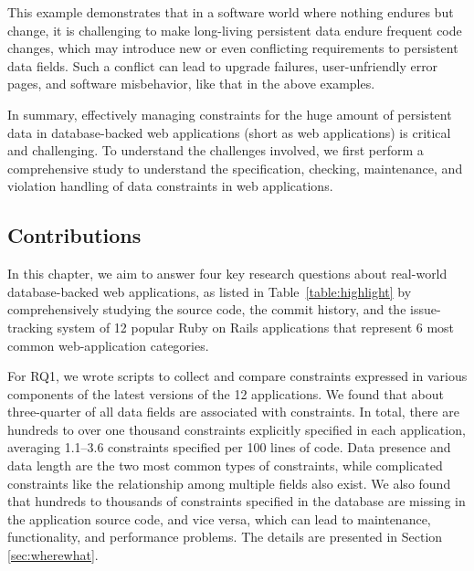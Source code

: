 This example demonstrates that in a software world where nothing endures but
change, it is challenging to make long-living persistent data endure
frequent code changes, which may introduce new or even conflicting  
requirements to persistent data fields. Such a conflict can lead to 
 upgrade failures, user-unfriendly error pages, and software misbehavior, like
 that in the above examples.


 
In summary, effectively managing constraints for the huge amount of persistent data in 
database-backed
web applications (short as web applications) is critical and challenging. 
To understand the challenges involved, we first perform a comprehensive study to understand the specification, checking, maintenance, and
violation handling of data constraints in web applications.




 





 

\subsection{Contributions}
In this chapter, we aim to answer four key research questions about real-world database-backed
web applications, as listed in Table~\ref{table:highlight} by comprehensively
studying the source code, the commit history, and the issue-tracking system of 12 popular Ruby on Rails applications that represent 6 most common web-application categories. 

{For RQ1}, we wrote scripts to collect and compare constraints expressed in various components of the latest versions of the 12 applications. We found that about three-quarter of all data fields are associated with constraints. In total, there are hundreds to over 
one thousand constraints explicitly specified in 
each application, averaging 1.1--3.6 constraints
specified per 100 lines of code. Data presence and data length are the two most common types of constraints,
while complicated constraints like the relationship among multiple fields also exist. 
We also found
that hundreds to thousands of constraints specified in the
database are missing in the application source code, and vice versa, 
which can lead to maintenance, functionality,
and performance problems.
The details are presented in Section \ref{sec:wherewhat}.



